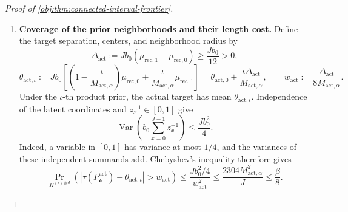 \documentclass[11pt]{article}
\begin{document}
\begin{proof}[Proof of \cref{obj:thm:connected-interval-frontier}]
\begin{enumerate}
To bound this last probability, define
\[
K_{\mathrm{tail}}:=K+1,\qquad
\lambda_{\mathrm{act}}:=nb_0qH=\frac{\eta K^2}{\ell}.
\]
The membership and activation pattern has a common law under all the
priors, and each \(V_x\) has distribution
\(\operatorname{Binomial}(n,b_0qH)\). Counting subsets of
\(K_{\mathrm{tail}}\) successful observations gives
\[
E\binom{V_x}{K_{\mathrm{tail}}}
=
\binom{n}{K_{\mathrm{tail}}}(b_0qH)^{K_{\mathrm{tail}}},
\]
with both sides zero when \(K_{\mathrm{tail}}>n\). Since
\(\mathbf1\{V_x>K\}\le\binom{V_x}{K_{\mathrm{tail}}}\),
\[
\Pr(V_x>K)
\le\frac{\lambda_{\mathrm{act}}^{K_{\mathrm{tail}}}}
         {K_{\mathrm{tail}}!}.
\]
The ceiling inequalities imply
\[
\lambda_{\mathrm{act}}
=\frac{\eta K^2}{\ell}
\le2\eta K_{\mathrm{tail}}
\le e^{-31}K_{\mathrm{tail}},
\qquad
K_{\mathrm{tail}}\ge\ell.
\]
Using the \(K_{\mathrm{tail}}\)-th term of the exponential series,
\[
\frac{\lambda_{\mathrm{act}}^{K_{\mathrm{tail}}}}
     {K_{\mathrm{tail}}!}
\le
e^{-31K_{\mathrm{tail}}}
\frac{K_{\mathrm{tail}}^{K_{\mathrm{tail}}}}
     {K_{\mathrm{tail}}!}
\le e^{-30K_{\mathrm{tail}}}
\le e^{-30\ell}.
\]
A union bound, followed by the mass cap and
\(N\le e^\ell\), \(\ell\le e^\ell\), now gives
\[
\widetilde{\mathbb Q}_{\mathrm{act},0}(G_{\mathrm{act}}^c)
\le Je^{-30\ell}
\le \frac{N\ell}{2e^{-32}}e^{-30\ell}
\le e^{32-28\ell}.
\]
Finally, the definition of \(T_{\mathrm{act},\alpha}\) implies
\[
\ell\ge\frac{32-\log(\beta/16)}{28},
\qquad
e^{32-28\ell}\le\frac\beta{16}.
\]
Thus, for every grid index,
\[
\operatorname{TV}
\bigl(\mathbb Q_{\mathrm{act},0},
      \mathbb Q_{\mathrm{act},\iota}\bigr)
\le\frac\beta{16}.
\]

\item \textbf{Coverage of the prior neighborhoods and their length cost.}
Define the target separation, centers, and neighborhood radius by
\[
\Delta_{\mathrm{act}}
:=Jb_0(\mu_{\mathrm{rec},1}-\mu_{\mathrm{rec},0})
\ge\frac{Jb_0}{12}>0,
\]
\[
\theta_{\mathrm{act},\iota}
:=
Jb_0\left[
\left(1-\frac{\iota}{M_{\mathrm{act},\alpha}}\right)
\mu_{\mathrm{rec},0}
+\frac{\iota}{M_{\mathrm{act},\alpha}}\mu_{\mathrm{rec},1}
\right]
=
\theta_{\mathrm{act},0}
+\frac{\iota\Delta_{\mathrm{act}}}{M_{\mathrm{act},\alpha}},
\qquad
w_{\mathrm{act}}
:=\frac{\Delta_{\mathrm{act}}}{8M_{\mathrm{act},\alpha}}.
\]
Under the \(\iota\)-th product prior, the actual target has mean
\(\theta_{\mathrm{act},\iota}\). Independence of the latent coordinates
and \(z_x^{-1}\in[0,1]\) give
\[
\operatorname{Var}\!\left(
b_0\sum_{x=0}^{J-1}z_x^{-1}
\right)\le\frac{Jb_0^2}{4}.
\]
Indeed, a variable in \([0,1]\) has variance at most \(1/4\), and the
variances of these independent summands add. Chebyshev's inequality
therefore gives
\[
\Pr_{\Pi^{(\iota)\otimes d}}\!\left(
\left|\tau(P^{\mathrm{act}}_{\mathbf z})
-\theta_{\mathrm{act},\iota}\right|>w_{\mathrm{act}}
\right)
\le
\frac{Jb_0^2/4}{w_{\mathrm{act}}^2}
\le
\frac{2304M_{\mathrm{act},\alpha}^2}{J}
\le\frac\beta8.
\]


\end{enumerate}
\end{proof}
\end{document}
